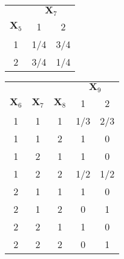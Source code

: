 \documentclass[11pt,fancychapters]{article}
\begin{document}
\centering
\begin{tabular}{| c | c c |} 
	\hline
    & \multicolumn{2}{c|}{$\mathbf{X}_7$} \\
	$\mathbf{X}_5$  & 1 & 2 \\ \hline
	1 & 1/4 & 3/4 \\
	2 & 3/4 & 1/4 \\ [1ex]
	\hline
\end{tabular}
\quad
\begin{tabular}{| c c c | c c |} 
	\hline
	& & & \multicolumn{2}{c|}{$\mathbf{X}_9$} \\
	$\mathbf{X}_6$ & $\mathbf{X}_7$ & $\mathbf{X}_8$ & 1 & 2 \\ \hline
	1 & 1 & 1 & 1/3 & 2/3 \\
	1 & 1 & 2 & 1 & 0 \\
	1 & 2 & 1 & 1 & 0 \\
	1 & 2 & 2 & 1/2 & 1/2 \\
	2 & 1 & 1 & 1 & 0 \\
	2 & 1 & 2 & 0 & 1 \\
	2 & 2 & 1 & 1 & 0 \\
	2 & 2 & 2 & 0 & 1 \\ [1ex]
	\hline
\end{tabular}
\end{document}

